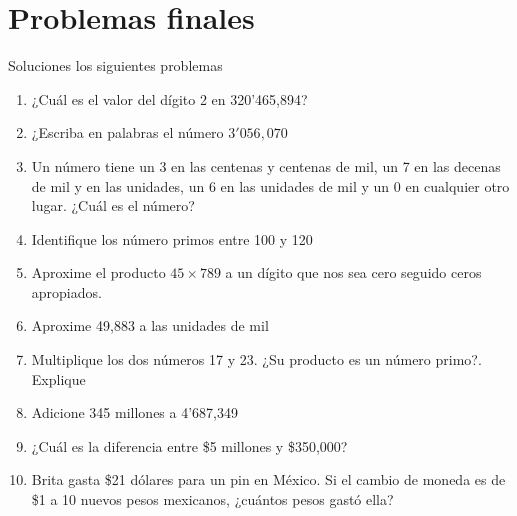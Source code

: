 \documentclass[twoside]{article}
\begin{document}
\section*{Problemas finales}
Soluciones los siguientes problemas
\begin{enumerate}
\item ¿Cuál es el valor del dígito 2 en 320'465,894?
\item ¿Escriba en palabras el número $3'056,070$
\item Un número tiene un 3 en las centenas y centenas de mil, un 7 en las decenas de mil y en las unidades, un 6 en las unidades de mil y un 0 en cualquier otro lugar. ¿Cuál es el número?
\item Identifique los número primos entre 100 y 120
\item Aproxime el producto $45\times 789$ a un dígito que nos sea cero seguido ceros apropiados.
\item Aproxime 49,883 a las unidades de mil
\item Multiplique los dos números 17 y 23. ¿Su producto es un número primo?. Explique
\item Adicione 345 millones a 4'687,349
\item ¿Cuál es la diferencia entre \$5 millones y \$350,000?
\item Brita gasta \$21 dólares para un pin en México. Si el cambio de moneda es de \$1 a 10 nuevos pesos mexicanos, ¿cuántos pesos gastó ella?
\end{enumerate}
\end{document}
